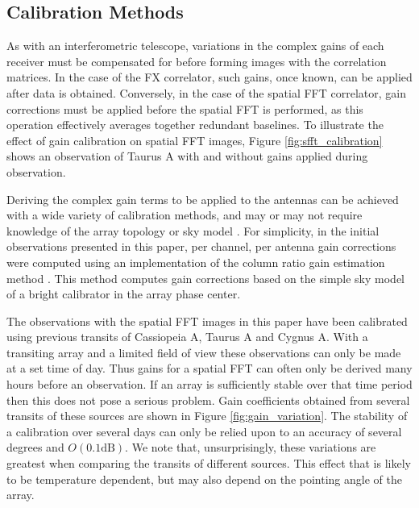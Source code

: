 \documentclass[useAMS,macros,usenatbib]{mn2e}
\begin{document}
\subsection{Calibration Methods}
\label{calibration}

As with an interferometric telescope, variations in the complex gains of each receiver must be compensated for before forming images with the correlation matrices.
In the case of the FX correlator, such gains, once known,  can be applied after data is obtained.
Conversely, in the case of the spatial FFT correlator, gain corrections must be applied before the spatial FFT is performed, as this operation effectively averages together redundant baselines.
To illustrate the effect of gain calibration on spatial FFT images, Figure \ref{fig:sfft_calibration} shows an observation of Taurus A with and without gains applied during observation.

Deriving the complex gain terms to be applied to the antennas can be achieved with a wide variety of calibration methods, and may or may not require knowledge of the array topology or sky model \citep{cal_strategies}.
For simplicity, in the initial observations presented in this paper, per channel, per antenna gain corrections were computed using an implementation of the column ratio gain estimation method \citep{gaindecomp}.
This method computes gain corrections based on the simple sky model of a bright calibrator in the array phase center.

The observations with the spatial FFT images in this paper have been calibrated using previous transits of Cassiopeia A, Taurus A and Cygnus A.
With a transiting array and a limited field of view these observations can only be made at a set time of day.
Thus gains for a spatial FFT can often only be derived many hours before an observation.
If an array is sufficiently stable over that time period then this does not pose a serious problem.
Gain coefficients obtained from several transits of these sources are shown in Figure \ref{fig:gain_variation}.
The stability of a calibration over several days can only be relied upon to an accuracy of several degrees and $O(0.1\mathrm{dB})$.
We note that, unsurprisingly, these variations are greatest when comparing the transits of different sources.
This effect that is likely to be temperature dependent, but may also depend on the pointing angle of the array.
\end{document}
